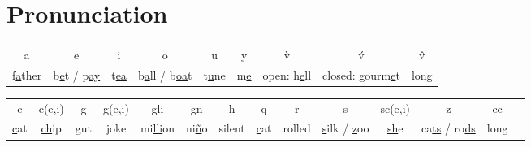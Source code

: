 \section*{Pronunciation}

\begin{tabular}{ccccccccc}
 a & e & i & o & u & y & \`{v} & \'{v} & \^{v} \\
f\underline{a}ther & b\underline{e}t / p\underline{ay} & t\underline{ea} & b\underline{a}ll / b\underline{oa}t & t\underline{u}ne & m\underline{e} & open: h\underline{e}ll & closed: gourm\underline{e}t & long \\
\end{tabular}

\begin{tabular}{cccccccccccccc}
 c & c(e,i) & g & g(e,i) & gli & gn & h & q & r & s & sc(e,i) & z & cc \\
\underline{c}at & \underline{ch}ip & \underline{g}ut & \underline{j}oke & mi\underline{lli}on & ni\underline{\~{n}}o & silent & \underline{c}at & rolled & \underline{s}ilk / \underline{z}oo & \underline{sh}e & ca\underline{ts} / ro\underline{ds} & long \\
\end{tabular}


